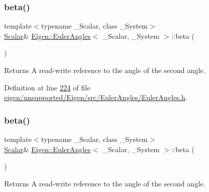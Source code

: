 \subsubsection{\texorpdfstring{beta()}{beta()}\hspace{0.1cm}{\footnotesize\ttfamily [3/4]}}
{\footnotesize\ttfamily template$<$typename \+\_\+\+Scalar, class \+\_\+\+System$>$ \\
\hyperlink{class_eigen_1_1_euler_angles_a2ab1d433ac9683268446f8905ac31aac}{Scalar}\& \hyperlink{class_eigen_1_1_euler_angles}{Eigen\+::\+Euler\+Angles}$<$ \+\_\+\+Scalar, \+\_\+\+System $>$\+::beta (\begin{DoxyParamCaption}{ }\end{DoxyParamCaption})\hspace{0.3cm}{\ttfamily [inline]}}

\begin{DoxyReturn}{Returns}
A read-\/write reference to the angle of the second angle. 
\end{DoxyReturn}


Definition at line \hyperlink{eigen_2unsupported_2_eigen_2src_2_euler_angles_2_euler_angles_8h_source_l00224}{224} of file \hyperlink{eigen_2unsupported_2_eigen_2src_2_euler_angles_2_euler_angles_8h_source}{eigen/unsupported/\+Eigen/src/\+Euler\+Angles/\+Euler\+Angles.\+h}.

\mbox{\label{class_eigen_1_1_euler_angles_a2db042cfba5486d46fdeb77fecd8e509}} 
\subsubsection{\texorpdfstring{beta()}{beta()}\hspace{0.1cm}{\footnotesize\ttfamily [4/4]}}
{\footnotesize\ttfamily template$<$typename \+\_\+\+Scalar, class \+\_\+\+System$>$ \\
\hyperlink{class_eigen_1_1_euler_angles_a2ab1d433ac9683268446f8905ac31aac}{Scalar}\& \hyperlink{class_eigen_1_1_euler_angles}{Eigen\+::\+Euler\+Angles}$<$ \+\_\+\+Scalar, \+\_\+\+System $>$\+::beta (\begin{DoxyParamCaption}{ }\end{DoxyParamCaption})\hspace{0.3cm}{\ttfamily [inline]}}

\begin{DoxyReturn}{Returns}
A read-\/write reference to the angle of the second angle. 
\end{DoxyReturn}



